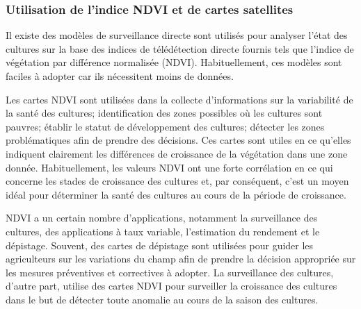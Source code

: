 \documentclass[12pt, openany]{report}
\begin{document}
\subsubsection{Utilisation de l'indice NDVI et de cartes satellites}

Il existe des modèles de surveillance directe sont utilisés pour analyser l'état des cultures sur la base des indices de télédétection directe fournis tels que l'indice de végétation par différence normalisée (NDVI). Habituellement, ces modèles sont faciles à adopter car ils nécessitent moins de données.

Les cartes NDVI sont utilisées dans la collecte d'informations sur la variabilité de la santé des cultures; identification des zones possibles où les cultures sont pauvres; établir le statut de développement des cultures; détecter les zones problématiques afin de prendre des décisions. Ces cartes sont utiles en ce qu'elles indiquent clairement les différences de croissance de la végétation dans une zone donnée. Habituellement, les valeurs NDVI ont une forte corrélation en ce qui concerne les stades de croissance des cultures et, par conséquent, c'est un moyen idéal pour déterminer la santé des cultures au cours de la période de croissance.

NDVI a un certain nombre d'applications, notamment la surveillance des cultures, des applications à taux variable, l'estimation du rendement et le dépistage. Souvent, des cartes de dépistage sont utilisées pour guider les agriculteurs sur les variations du champ afin de prendre la décision appropriée sur les mesures préventives et correctives à adopter. La surveillance des cultures, d'autre part, utilise des cartes NDVI pour surveiller la croissance des cultures dans le but de détecter toute anomalie au cours de la saison des cultures.
\end{document}
